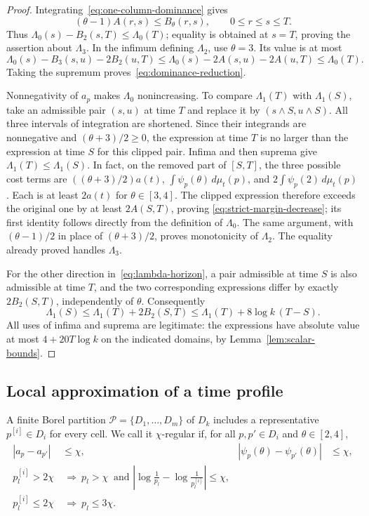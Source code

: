 \documentclass[11pt]{article}
\numberwithin{equation}{section}
\theoremstyle{definition}
\theoremstyle{remark}
\newcommand{\1}{\mathbf 1}
\begin{document}
\begin{proof}
Integrating~\eqref{eq:one-column-dominance} gives
\[
 (\theta-1)A(r,s)\le B_\theta(r,s),\qquad 0\le r\le s\le T.
\]
Thus $\Lambda_0(s)-B_2(s,T)\le\Lambda_0(T)$; equality is obtained at
$s=T$, proving the assertion about $\Lambda_3$. In the infimum defining
$\Lambda_2$, use $\theta=3$. Its value is at most
\[
 \Lambda_0(s)-B_3(s,u)-2B_2(u,T)
 \le\Lambda_0(s)-2A(s,u)-2A(u,T)
 \le\Lambda_0(T).
\]
Taking the supremum proves~\eqref{eq:dominance-reduction}.

Nonnegativity of $a_p$ makes $\Lambda_0$ nonincreasing. To compare
$\Lambda_1(T)$ with $\Lambda_1(S)$, take an admissible pair $(s,u)$ at
time $T$ and replace it by $(s\wedge S,u\wedge S)$. All three intervals
of integration are shortened. Since their integrands are nonnegative
and $(\theta+3)/2\ge0$, the expression at time $T$ is no larger than
the expression at time $S$ for this clipped pair. Infima and then
suprema give $\Lambda_1(T)\le\Lambda_1(S)$. In fact, on the
removed part of $[S,T]$, the three possible cost terms are
$((\theta+3)/2)a(t)$, $\int\psi_p(\theta)\,d\mu_t(p)$,
and $2\int\psi_p(2)\,d\mu_t(p)$. Each is at least $2a(t)$
for $\theta\in[3,4]$. The clipped expression therefore exceeds
the original one by at least $2A(S,T)$, proving
\eqref{eq:strict-margin-decrease}; its first identity follows
directly from the definition of $\Lambda_0$. The same argument, with
$(\theta-1)/2$ in place of $(\theta+3)/2$, proves monotonicity of
$\Lambda_2$. The equality already proved handles $\Lambda_3$.

For the other direction in~\eqref{eq:lambda-horizon}, a pair admissible
at time $S$ is also admissible at time $T$, and the two corresponding
expressions differ by exactly $2B_2(S,T)$, independently of $\theta$.
Consequently
\[
 \Lambda_1(S)\le\Lambda_1(T)+2B_2(S,T)
 \le\Lambda_1(T)+8\log k\,(T-S).
\]
All uses of infima and suprema are legitimate: the expressions have
absolute value at most $4+20T\log k$ on the indicated domains, by
Lemma~\ref{lem:scalar-bounds}.
\end{proof}

\subsection{Local approximation of a time profile}
\label{subsec:profile-approximation}

A finite Borel partition $\mathcal P=\{D_1,\ldots,D_m\}$ of $D_k$
includes a representative $p^{[i]}\in D_i$ for every cell. We call it
$\chi$-regular if, for all $p,p'\in D_i$ and $\theta\in[2,4]$,
\begin{align}%
\label{eq:partition-regularity}
 |a_p-a_{p'}|&\le\chi,&
 |\psi_p(\theta)-\psi_{p'}(\theta)|&\le\chi,\nonumber\\
 p^{[i]}_l>2\chi&\ \Longrightarrow\
 p_l>\chi\ \text{ and }\left|\log\frac1{p_l}-\log\frac1{p^{[i]}_l}\right|\le\chi,
 \nonumber\\
 p^{[i]}_l\le2\chi&\ \Longrightarrow\ p_l\le3\chi.
\end{align}
\end{document}
